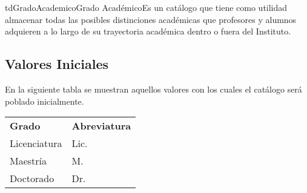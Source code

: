 	 
\begin{TipoDeDato}{tdGradoAcademico}{Grado Académico}{Es un catálogo que tiene como utilidad almacenar todas las posibles distinciones académicas que profesores y alumnos adquieren a lo largo de su trayectoria académica dentro o fuera del Instituto.}
		 \begin{tdAtributos}
		 \end{tdAtributos}
		 
	 \subsection{Valores Iniciales}
	 	 En la siguiente tabla se muestran aquellos valores con los cuales el catálogo será poblado inicialmente.\cdtEmpty
	 		\begin{longtable}{| p{}| p{}|}
	 			\rowcolor{colorPrincipal}
	 			\multicolumn{2}{|c|}{\bf \color{white} Valores Iniciales}\\
	 			\hline
	 			\rowcolor{colorSecundario}
	 			\bf \color{white} Grado & \bf \color{white} Abreviatura \\
	 			\hline
	 			Licenciatura & Lic.\\
	 			\hline
	 			Maestría & M. \\
	 			\hline
	 			Doctorado & Dr. \\
	 			\hline
	 		\end{longtable}
	 \end{TipoDeDato}

